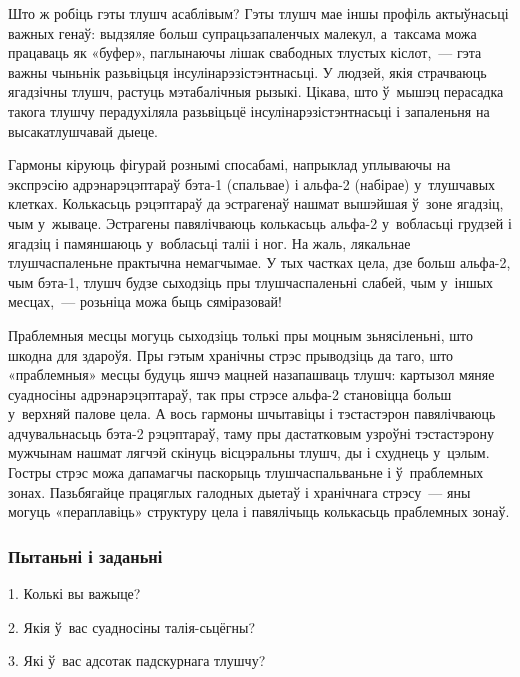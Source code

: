 Што ж робіць гэты тлушч асаблівым? Гэты тлушч мае іншы профіль актыўнасьці важных генаў: выдзяляе больш супрацьзапаленчых малекул, а~таксама можа працаваць як «буфер», паглынаючы лішак свабодных тлустых кіслот,~--- гэта важны чыньнік разьвіцьця інсулінарэзістэнтнасьці. У людзей, якія страчваюць ягадзічны тлушч, растуць мэтабалічныя рызыкі. Цікава, што ў~мышэц перасадка такога тлушчу перадухіляла разьвіцьцё інсулінарэзістэнтнасьці і запаленьня на высакатлушчавай дыеце.

Гармоны кіруюць фігурай рознымі спосабамі, напрыклад уплываючы на экспрэсію адрэнарэцэптараў бэта-1 (спальвае) і альфа-2 (набірае) у~тлушчавых клетках. Колькасьць рэцэптараў да эстрагенаў нашмат вышэйшая ў~зоне ягадзіц, чым у~жываце. Эстрагены павялічваюць колькасьць альфа-2 у~вобласьці грудзей і ягадзіц і памяншаюць у~вобласьці таліі і ног. На жаль, лякальнае тлушчаспаленьне практычна немагчымае. У тых частках цела, дзе больш альфа-2, чым бэта-1, тлушч будзе сыходзіць пры тлушчаспаленьні слабей, чым у~іншых месцах,~--- розьніца можа быць сяміразовай!

Праблемныя месцы могуць сыходзіць толькі пры моцным зьнясіленьні, што шкодна для здароўя. Пры гэтым хранічны стрэс прыводзіць да таго, што «праблемныя» месцы будуць яшчэ мацней назапашваць тлушч: картызол мяняе суадносіны адрэнарэцэптараў, так пры стрэсе альфа-2 становіцца больш у~верхняй палове цела. А вось гармоны шчытавіцы і тэстастэрон павялічваюць адчувальнасьць бэта-2 рэцэптараў, таму пры дастатковым узроўні тэстастэрону мужчынам нашмат лягчэй скінуць вісцэральны тлушч, ды і схуднець у~цэлым. Гостры стрэс можа дапамагчы паскорыць тлушчаспальваньне і ў~праблемных зонах. Пазьбягайце працяглых галодных дыетаў і хранічнага стрэсу~--- яны могуць «пераплавіць» структуру цела і павялічыць колькасьць праблемных зонаў.

\subsubsection{Пытаньні і заданьні}

1. Колькі вы важыце?

2. Якія ў~вас суадносіны талія-сьцёгны?

3. Які ў~вас адсотак падскурнага тлушчу?

